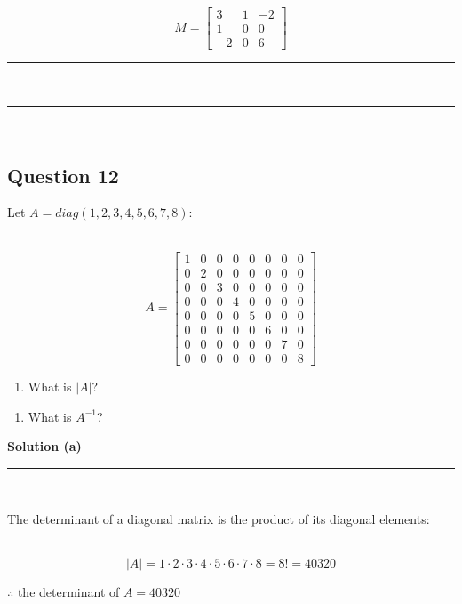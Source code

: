 \documentclass{article}
\begin{document}
$$M = \begin{bmatrix} 3 & 1 & -2 \\ 1 & 0 & 0 \\ -2 & 0 & 6 \end{bmatrix}$$

\noindent\rule{\textwidth}{0.4pt}\\

\noindent\rule{\textwidth}{0.4pt}\\

\newpage

\subsection*{Question 12}

\parbox{\textwidth}{Let $A= diag(1,2,3,4,5,6,7,8)$:}\\

$$A = \begin{bmatrix}
    1 & 0 & 0 & 0 & 0 & 0 & 0 & 0 \\
    0 & 2 & 0 & 0 & 0 & 0 & 0 & 0 \\
    0 & 0 & 3 & 0 & 0 & 0 & 0 & 0 \\
    0 & 0 & 0 & 4 & 0 & 0 & 0 & 0 \\
    0 & 0 & 0 & 0 & 5 & 0 & 0 & 0 \\
    0 & 0 & 0 & 0 & 0 & 6 & 0 & 0 \\
    0 & 0 & 0 & 0 & 0 & 0 & 7 & 0 \\
    0 & 0 & 0 & 0 & 0 & 0 & 0 & 8
\end{bmatrix}$$

\begin{enumerate}[label=(a)]
    \item What is $|A|$?
\end{enumerate}

\begin{enumerate}[label=(b)]
    \item What is $A^{-1}$?
\end{enumerate}

\parbox{\textwidth}{\textbf{Solution (a)}}
\noindent\rule{\textwidth}{0.4pt}\\
\parbox{\textwidth}{The determinant of a diagonal matrix is the product of its diagonal elements:}\\
$$|A| = 1 \cdot 2 \cdot 3 \cdot 4 \cdot 5 \cdot 6 \cdot 7 \cdot 8 = 8! = 40320$$

\parbox{\textwidth}{$\therefore$ the determinant of $A= 40320$}\\
\end{document}
